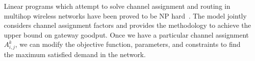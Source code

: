 

Linear programs which attempt to solve channel assignment and routing in multihop
wireless networks have been proved to be NP hard~\cite{tang2005interference,yuan2006cross}. 
The model jointly considers channel assignment factors and provides the methodology to achieve the upper bound on gateway goodput.  Once we have a particular channel assignment $A_{i,j}^k$, we can 
modify the objective function, parameters, and constraints to find the maximum 
satisfied demand in the network.  




